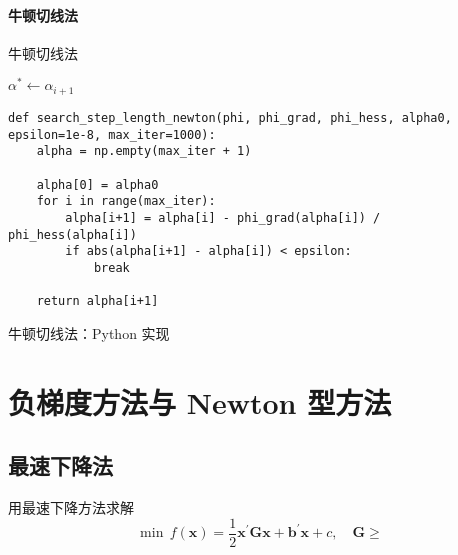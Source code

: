 \documentclass[cn]{elegantbook}
\begin{document}
\subsubsection{牛顿切线法}

\begin{algorithm}
    \caption{牛顿切线法}
    $\alpha^{*}\leftarrow\alpha_{i+1}$\;
\end{algorithm}

\begin{listing}
    \begin{verbatim}
def search_step_length_newton(phi, phi_grad, phi_hess, alpha0, epsilon=1e-8, max_iter=1000):
    alpha = np.empty(max_iter + 1)

    alpha[0] = alpha0
    for i in range(max_iter):
        alpha[i+1] = alpha[i] - phi_grad(alpha[i]) / phi_hess(alpha[i])
        if abs(alpha[i+1] - alpha[i]) < epsilon:
            break
    
    return alpha[i+1]
    \end{verbatim}
    \caption{牛顿切线法：Python 实现}
\end{listing}

\chapter{负梯度方法与 Newton 型方法}

\section{最速下降法}

\begin{example}
    用最速下降方法求解
    \begin{equation}
        \min\,f(\mathbf{x})=\frac{1}{2}\mathbf{x}^{\prime}\mathbf{G}\mathbf{x}+\mathbf{b}^{\prime}\mathbf{x}+c,\quad\mathbf{G}\ge
    \end{equation}
\end{example}
\end{document}
